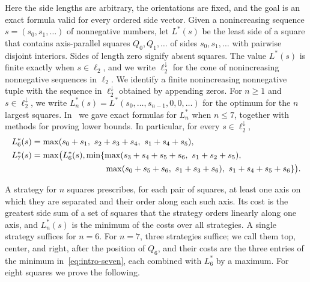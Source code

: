 \documentclass[12pt]{amsart}
\theoremstyle{definition}
\theoremstyle{remark}
\numberwithin{equation}{section}
\numberwithin{figure}{section}
\numberwithin{table}{section}
\newcommand{\st}[1]{\mathrm{#1}}
\begin{document}
Here the side lengths are arbitrary, the orientations are fixed, and the
goal is an exact formula valid for every ordered side vector. Given a
nonincreasing sequence $s=(s_0,s_1,\ldots)$ of nonnegative numbers, let
$L^*(s)$ be the least side of a square that contains axis-parallel squares
$Q_0,Q_1,\ldots$ of sides $s_0,s_1,\ldots$ with pairwise disjoint interiors. Sides of length
zero signify absent squares. The value $L^*(s)$ is finite exactly when
$s\in\ell_2$, and we write $\ell_2^\downarrow$ for the cone of nonincreasing
nonnegative sequences in $\ell_2$. We identify a finite nonincreasing
nonnegative tuple with the sequence in $\ell_2^\downarrow$ obtained by
appending zeros. For $n\ge1$ and $s\in\ell_2^\downarrow$, we write
$L_n^*(s)=L^*(s_0,\ldots,s_{n-1},0,0,\ldots)$ for the optimum for the $n$ largest squares. In~\cite{BadgerSeven} we gave
exact formulas for $L_n^*$ when $n\le7$, together with methods for proving
lower bounds. In particular, for every $s\in\ell_2^\downarrow$,
\begin{align}
L_6^*(s)&=\max(s_0+s_1,\ s_2+s_3+s_4,\ s_1+s_4+s_5),\label{eq:intro-six}\\
L_7^*(s)&=\max\bigl(L_6^*(s),\min\{\max(s_3+s_4+s_5+s_6,\ s_1+s_2+s_5),\notag\\
&\hphantom{{}=\max\bigl(L_6^*(s),\min\{}\max(s_0+s_5+s_6,\ s_1+s_3+s_6),\ s_1+s_4+s_5+s_6\}\bigr).\label{eq:intro-seven}
\end{align}

A strategy for $n$ squares prescribes, for each pair of squares, at least
one axis on which they are separated and their order along each such axis.
Its cost is the greatest side sum of a set of squares that the strategy
orders linearly along one axis, and $L_n^*(s)$ is the minimum of the costs
over all strategies. A single strategy suffices for $n=6$. For $n=7$, three
strategies suffice; we call them $\st{top}$, $\st{center}$, and
$\st{right}$, after the position of $Q_6$, and their costs are the three
entries of the minimum in~\eqref{eq:intro-seven}, each combined with
$L_6^*$ by a maximum. For eight squares we prove the following.
\end{document}
